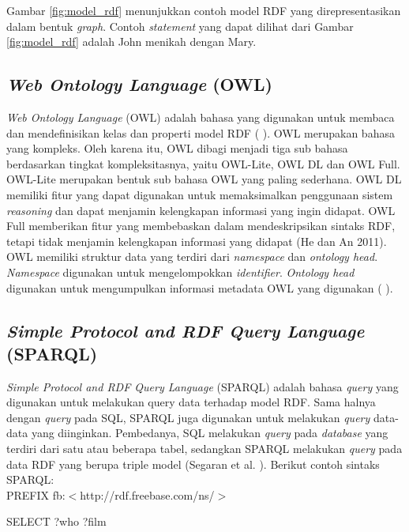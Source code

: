 Gambar \ref{fig:model_rdf} menunjukkan contoh model RDF yang direpresentasikan dalam bentuk \textit{graph}.  Contoh \textit{statement} yang dapat dilihat dari Gambar \ref{fig:model_rdf} adalah John menikah dengan Mary.

\subsection*{\textit{Web Ontology Language} (OWL)}

\textit{Web Ontology Language} (OWL) adalah bahasa yang digunakan untuk membaca dan mendefinisikan kelas dan properti model RDF (\citeauthor{SEGARAB2009} \cite*{SEGARAB2009}). OWL merupakan bahasa yang kompleks. Oleh karena itu, OWL dibagi menjadi tiga sub bahasa berdasarkan tingkat kompleksitasnya, yaitu OWL-Lite, OWL DL dan OWL Full. OWL-Lite merupakan bentuk sub bahasa OWL yang paling sederhana. OWL DL memiliki fitur yang dapat digunakan untuk memaksimalkan penggunaan sistem \textit{reasoning} dan dapat menjamin kelengkapan informasi yang ingin didapat. OWL Full memberikan fitur yang membebaskan dalam mendeskripsikan sintaks RDF, tetapi tidak menjamin kelengkapan informasi yang didapat (He dan An 2011). OWL memiliki struktur data yang terdiri dari \textit{namespace} dan \textit{ontology head}. \textit{Namespace} digunakan untuk mengelompokkan \textit{identifier}. \textit{Ontology head} digunakan untuk mengumpulkan informasi metadata OWL yang digunakan (\citeauthor{HEG2010} \cite*{HEG2010}).

\subsection*{\textit{Simple Protocol and RDF Query Language} (SPARQL)}

\textit{Simple Protocol and RDF Query Language} (SPARQL) adalah bahasa \textit{query} yang digunakan untuk melakukan query data terhadap model RDF. Sama halnya dengan \textit{query} pada SQL, SPARQL juga digunakan untuk melakukan \textit{query} data-data yang diinginkan. Pembedanya, SQL melakukan \textit{query} pada \textit{database} yang terdiri dari satu atau beberapa tabel, sedangkan SPARQL melakukan \textit{query} pada data RDF yang berupa triple model (Segaran et al. \citeauthor{SEGARAB2009} \cite*{SEGARAB2009}). Berikut contoh sintaks SPARQL:
\\

PREFIX fb:$<$http://rdf.freebase.com/ns/$>$

SELECT ?who ?film

